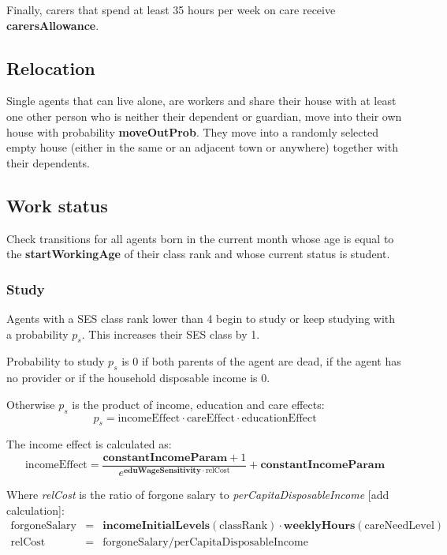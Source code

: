 \documentclass{article}
\newcommand{\marginnote}[1]{\protect\marginpar{\small\texttt{#1}}}
\begin{document}
Finally, carers that spend at least 35 hours per week on care receive \textbf{carersAllowance}.



\subsection{Relocation \marginnote{Relocate.jl}}

Single agents that can live alone, are workers and share their house with at least one other person who is neither their dependent or guardian, move into their own house with probability \textbf{moveOutProb}. They move into a randomly selected empty house (either in the same or an adjacent town or anywhere) together with their dependents.


\subsection{Work status \marginnote{Social.jl}}

Check transitions for all agents born in the current month whose age is 
equal to the \textbf{startWorkingAge} of their class rank and whose current status is student.


\subsubsection*{Study}

Agents with a SES class rank lower than 4 begin to study or keep studying with a probability $p_s$. This increases their SES class by 1. 

Probability to study $p_s$ is 0 if both parents of the agent are dead, if the agent has no provider or if the household disposable income is 0.

Otherwise $p_s$ is the product of income, education and care effects:
\[
p_s = \mathrm{incomeEffect} \cdot \mathrm{careEffect} \cdot \mathrm{educationEffect}
\]

The income effect is calculated as:
\[
\mathrm{incomeEffect} = \frac{\mathbf{constantIncomeParam} + 1}{ 
e^{\mathbf{eduWageSensitivity} \cdot \mathrm{relCost}}} + \mathbf{constantIncomeParam}
\]

Where \textit{relCost} is the ratio of forgone salary to \textit{perCapitaDisposableIncome} [add calculation]:
\begin{eqnarray*}
\mathrm{forgoneSalary} &=& \mathbf{incomeInitialLevels}(\mathrm{classRank}) \cdot 
\mathbf{weeklyHours}(\mathrm{careNeedLevel})\\
\mathrm{relCost} &=& \mathrm{forgoneSalary} / \mathrm{perCapitaDisposableIncome}
\end{eqnarray*}
\end{document}
